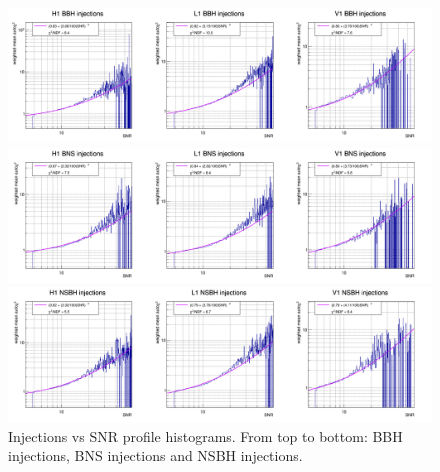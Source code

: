 \begin{figure}
  \centering
  \begin{minipage}{\linewidth}
    \includegraphics[width = \textwidth]{sectionImprovement/rwSNR/cProfile_BBH.png}
  \end{minipage}
  \begin{minipage}{\linewidth}
    \centering
    \includegraphics[width = \textwidth]{sectionImprovement/rwSNR/cProfile_BNS.png}
  \end{minipage}
  \begin{minipage}{\linewidth}
    \centering
    \includegraphics[width = \textwidth]{sectionImprovement/rwSNR/cProfile_NSBH.png}
  \end{minipage}
  \caption{Injections \achi vs SNR profile histograms. From top to bottom: BBH injections, BNS injections and NSBH injections.}
  \label{fig:fit_profile}
\end{figure}





